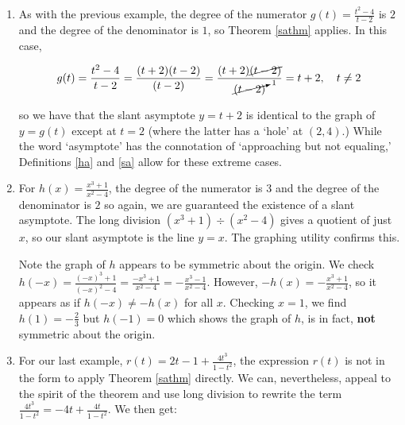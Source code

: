 \documentclass{ximera}
\begin{document}
\begin{example}
\begin{enumerate}
\item  As with the previous example, the degree of the numerator $g(t) = \frac{t^2-4}{t-2}$ is $2$ and the degree of the denominator is $1$, so Theorem \ref{sathm} applies.  In this case, 

\[ g(t) = \frac{t^2-4}{t-2} = \frac{(t+2)(t-2)}{(t-2)} = \frac{(t+2) \cancel{(t-2)}}{\cancelto{1}{(t-2)}} = t+2, \quad t \neq 2\]

so we have that the slant asymptote $y=t+2$ is identical to the graph of $y=g(t)$ except at $t=2$ (where the latter has a `hole' at $(2,4)$.) While the word `asymptote' has the connotation of `approaching but not equaling,' Definitions \ref{ha} and  \ref{sa} allow for these extreme cases.

\begin{center}
\end{center} 

\item   For $h(x) = \frac{x^3+1}{x^2-4}$, the degree of the numerator is $3$ and the degree of the denominator is $2$ so again, we are guaranteed the existence of a slant asymptote.  The long division $\left(x^3+1 \right) \div \left(x^2-4\right)$ gives a quotient of just $x$, so our slant asymptote is the line $y=x$.  The graphing utility confirms this.  

Note the graph of $h$ appears to be symmetric about the origin.  We check $h(-x) = \frac{(-x)^3+1}{(-x)^2-4} = \frac{-x^3+1}{x^2-4} = - \frac{x^3-1}{x^2-4}$.  However, $-h(x) = - \frac{x^3+1}{x^2-4}$, so it appears as if $h(-x) \neq -h(x)$ for all $x$.  Checking $x=1$, we find $h(1) = -\frac{2}{3}$ but $h(-1) = 0$ which shows the graph of $h$, is in fact,  \textbf{not} symmetric about the origin.

\begin{center}
\end{center} 

\item  For our last example,  $r(t) = 2t-1+\frac{4t^3}{1-t^2}$, the expression $r(t)$ is not in the form to apply Theorem \ref{sathm} directly.  We can, nevertheless, appeal to the spirit of the theorem and use long division to rewrite the term $\frac{4t^3}{1-t^2} = -4t + \frac{4t}{1-t^2}$.  We then get:

 \[ \begin{array}{rcl}
 

\end{array}\]
\end{enumerate}
\end{example}
\end{document}
